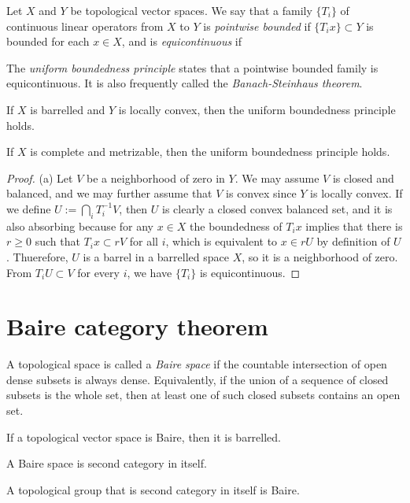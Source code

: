 \documentclass{../../large}
\begin{document}
\begin{prb}
Let $X$ and $Y$ be topological vector spaces.
We say that a family $\{T_i\}$ of continuous linear operators from $X$ to $Y$ is \emph{pointwise bounded} if $\{T_ix\}\subset Y$ is bounded for each $x\in X$, and is \emph{equicontinuous} if 

The \emph{uniform boundedness principle} states that a pointwise bounded family is equicontinuous.
It is also frequently called the \emph{Banach-Steinhaus theorem}.
\begin{parts}
\item If $X$ is barrelled and $Y$ is locally convex, then the uniform boundedness principle holds.
\item If $X$ is complete and metrizable, then the uniform boundedness principle holds.
\end{parts}
\end{prb}
\begin{proof}
(a)
Let $V$ be a neighborhood of zero in $Y$.
We may assume $V$ is closed and balanced, and we may further assume that $V$ is convex since $Y$ is locally convex.
If we define $U:=\bigcap_iT_i^{-1}V$, then $U$ is clearly a closed convex balanced set, and it is also absorbing because for any $x\in X$ the boundedness of $T_ix$ implies that there is $r\ge0$ such that $T_ix\subset rV$ for all $i$, which is equivalent to $x\in rU$ by definition of $U$.
Thuerefore, $U$ is a barrel in a barrelled space $X$, so it is a neighborhood of zero.
From $T_iU\subset V$ for every $i$, we have $\{T_i\}$ is equicontinuous.
\end{proof}



\section{Baire category theorem}

\begin{prb}
A topological space is called a \emph{Baire space} if the countable intersection of open dense subsets is always dense.
Equivalently, if the union of a sequence of closed subsets is the whole set, then at least one of such closed subsets contains an open set.
\begin{parts}
\item If a topological vector space is Baire, then it is barrelled.
\item A Baire space is second category in itself.
\item A topological group that is second category in itself is Baire.
\end{parts}
\end{prb}
\end{document}
